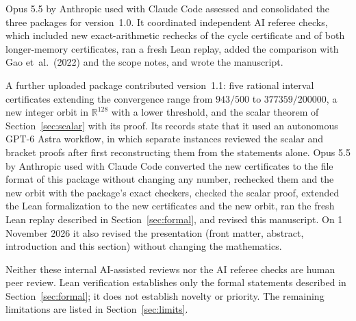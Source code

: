 \documentclass[11pt]{article}
\numberwithin{equation}{section}
\theoremstyle{definition}
\theoremstyle{remark}
\newcommand{\R}{\mathbb R}
\newcommand{\taulo}{943/500}
\newcommand{\taunew}{377359/200000}
\begin{document}
Opus 5.5 by Anthropic used with Claude Code assessed and consolidated the three packages for version~1.0. It coordinated independent AI referee checks, which included new exact-arithmetic rechecks of the cycle certificate and of both longer-memory certificates, ran a fresh Lean replay, added the comparison with Gao et~al.\ (2022) and the scope notes, and wrote the manuscript.

A further uploaded package contributed version~1.1: five rational interval certificates extending the convergence range from $\taulo$ to $\taunew$, a new integer orbit in $\R^{128}$ with a lower threshold, and the scalar theorem of Section~\ref{sec:scalar} with its proof. Its records state that it used an autonomous GPT-6 Astra workflow, in which separate instances reviewed the scalar and bracket proofs after first reconstructing them from the statements alone. Opus 5.5 by Anthropic used with Claude Code converted the new certificates to the file format of this package without changing any number, rechecked them and the new orbit with the package's exact checkers, checked the scalar proof, extended the Lean formalization to the new certificates and the new orbit, ran the fresh Lean replay described in Section~\ref{sec:formal}, and revised this manuscript. On 1 November 2026 it also revised the presentation (front matter, abstract, introduction and this section) without changing the mathematics.

Neither these internal AI-assisted reviews nor the AI referee checks are human peer review. Lean verification establishes only the formal statements described in Section~\ref{sec:formal}; it does not establish novelty or priority. The remaining limitations are listed in Section~\ref{sec:limits}.
\end{document}
